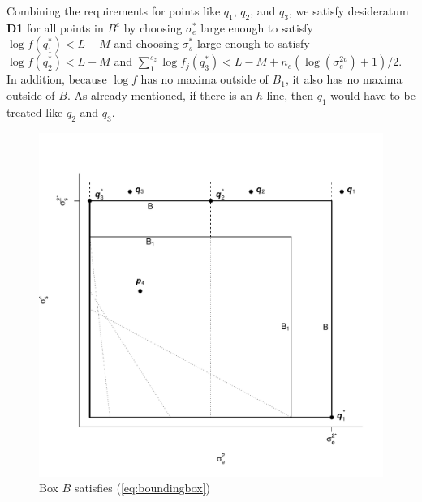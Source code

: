 \documentclass{report}
\newcommand{\RL}{f}
\newcommand{\logRL}{\log\RL}
\begin{document}
Combining the requirements for points like $q_1$, $q_2$, and $q_3$, we satisfy desideratum \textbf{D1} for all points in $B^c$ by choosing $\sigma_e^*$ large enough to satisfy $\logRL(q_1^*) < L-M$ and choosing $\sigma_s^*$ large enough to satisfy $\logRL(q_2^*) < L-M$ and $\sum_{1}^{s_z} \logRL_j(q_3^*) < L - M + n_e(\log(\sigma_e^{2v}) + 1)/2$.  In addition, because $\logRL$ has no maxima outside of $B_1$, it also has no maxima outside of $B$.  As already mentioned, if there is an $h$ line, then $q_1$ would have to be treated like $q_2$ and $q_3$.

\begin{figure}[h]
	\centering
	\includegraphics[width=.5\linewidth]{figs/boundingbox2.pdf}
	\caption{Box $B$ satisfies (\ref{eq:boundingbox})}
	\label{fig:boundingbox2}
\end{figure}
\end{document}
